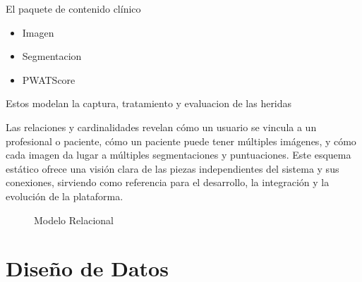 El paquete de contenido clínico
\begin{itemize}
    \item Imagen
    \item Segmentacion
    \item PWATScore
\end{itemize}

Estos modelan la captura, tratamiento y evaluacion de las heridas

Las relaciones y cardinalidades revelan cómo un usuario se vincula a un profesional o paciente, cómo un paciente puede tener múltiples imágenes, y cómo cada imagen da lugar a múltiples segmentaciones y puntuaciones.
Este esquema estático ofrece una visión clara de las piezas independientes del sistema y sus conexiones, sirviendo como referencia para el desarrollo, la integración y la evolución de la plataforma.
\begin{figure}[H]
  \centering
  \caption{Modelo Relacional}
  \label{fig:classesDiagram}
\end{figure}


\section{Diseño de Datos}
\label{sc:DD}

